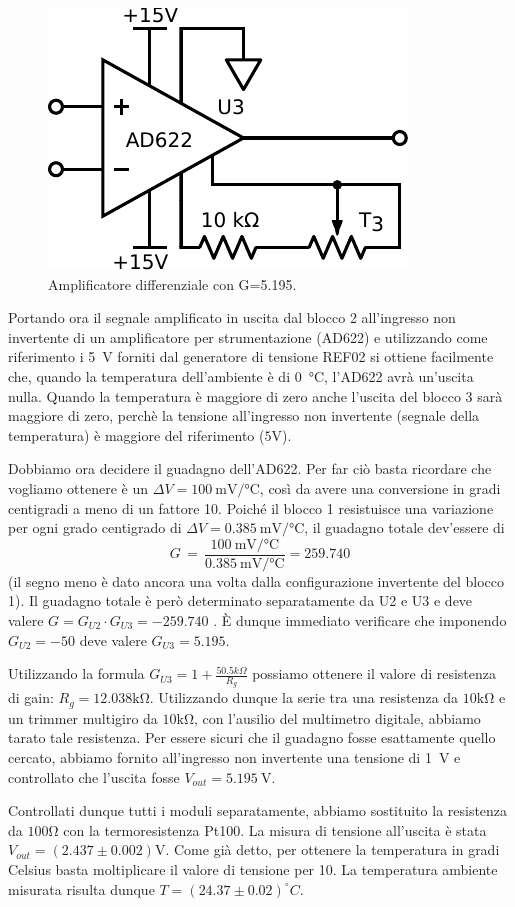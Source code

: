 \begin{figure}
\centering
\includegraphics[width=.27\textwidth]{../E06/latex/P3.pdf}
\caption{Amplificatore differenziale con G=5.195.}
\label{cir6:blocco3}
\end{figure}

Portando ora il segnale amplificato in uscita dal blocco 2 all'ingresso non invertente di un amplificatore per strumentazione (AD622) e utilizzando come riferimento i \SI{5}{\volt} forniti dal generatore di tensione REF02 si ottiene facilmente che, quando la temperatura dell'ambiente è di \SI{0}{\celsius}, l'AD622 avrà un'uscita nulla.
Quando la temperatura è maggiore di zero anche l'uscita del blocco 3 sarà maggiore di zero, perchè la tensione all'ingresso non invertente (segnale della temperatura) è maggiore del riferimento ($5\si{\volt}$).

Dobbiamo ora decidere il guadagno dell'AD622.
Per far ciò basta ricordare che vogliamo ottenere è un $\Delta V=\SI{100}{\milli\volt}/\si{\celsius}$, così da avere una conversione in gradi centigradi a meno di un fattore 10.
Poiché il blocco 1 resistuisce una variazione per ogni grado centigrado di $\Delta V=\SI{0.385}{\milli\volt}/\si{\celsius}$, il guadagno totale dev'essere di
$$G\,=\,\frac{\SI{100}{\milli\volt}/\si{\celsius}}{\SI{0.385}{\milli\volt}/\si{\celsius}}=\num{259.740}$$
(il segno meno è dato ancora una volta dalla configurazione invertente del blocco 1).
Il guadagno totale è però determinato separatamente da U2 e U3 e deve valere $G= G_{U2}\cdot G_{U3}=-259.740$ .
È dunque immediato verificare che imponendo $G_{U2}=-50$ deve valere $G_{U3}=5.195$.

Utilizzando la formula $G_{U3}=1+\frac{50.5k\Omega}{R_g}$ possiamo ottenere il valore di resistenza di gain: $R_g=12.038\si{\kilo\ohm}$.
Utilizzando dunque la serie tra una resistenza da $10\si{\kilo\ohm}$ e un trimmer multigiro da $10\si{\kilo\ohm}$, con l'ausilio del multimetro digitale, abbiamo tarato tale resistenza. 
Per essere sicuri che il guadagno fosse esattamente quello cercato, abbiamo fornito all'ingresso non invertente una tensione di \SI{1}{\volt} e controllato che l'uscita fosse $V_{out}=\SI{5.195}{\V}$. 

Controllati dunque tutti i moduli separatamente, abbiamo sostituito la resistenza da $100\si{\ohm}$ con la termoresistenza Pt100.
La misura di tensione all'uscita è stata $V_{out}=(2.437\pm 0.002)\si{\volt}$.
Come già detto, per ottenere la temperatura in gradi Celsius basta moltiplicare il valore di tensione per 10.
La temperatura ambiente misurata risulta dunque $T=(24.37\pm0.02)^{\circ}C$.

